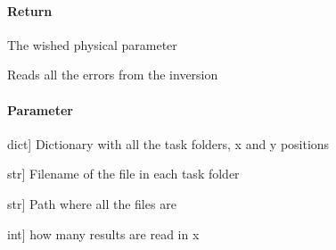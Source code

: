 \documentclass[letterpaper,10pt,english]{sphinxmanual}
\begin{document}
\begin{fulllineitems}
\begin{fulllineitems}
\begin{description}
\end{description}


\paragraph{Return}
\label{\detokenize{classes:id3}}
\sphinxAtStartPar
The wished physical parameter

\end{fulllineitems}


\begin{fulllineitems}
\label{\detokenize{classes:model.Model.read}}
\pysigstartsignatures
{}
\pysigstopsignatures
\end{fulllineitems}


\begin{fulllineitems}
\label{\detokenize{classes:model.Model.read_results}}
\pysigstartsignatures
{}
\pysigstopsignatures
\sphinxAtStartPar
Reads all the errors from the inversion


\paragraph{Parameter}
\label{\detokenize{classes:id4}}\begin{description}
\sphinxlineitem{task}{[}dict{]}
\sphinxAtStartPar
Dictionary with all the task folders, x and y positions

\sphinxlineitem{filename}{[}str{]}
\sphinxAtStartPar
Filename of the file in each task folder

\sphinxlineitem{path}{[}str{]}
\sphinxAtStartPar
Path where all the files are

\sphinxlineitem{nx}{[}int{]}
\sphinxAtStartPar
how many results are read in x


\end{description}
\end{fulllineitems}
\end{fulllineitems}
\end{document}
